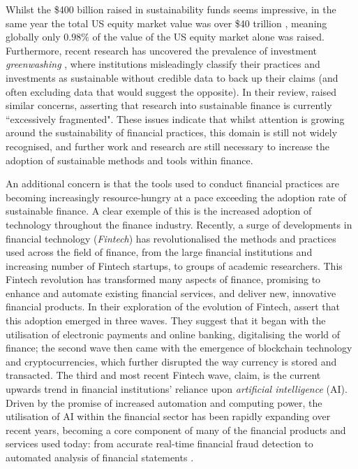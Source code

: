 \documentclass[a4paper, 11pt]{report}
\begin{document}
    Whilst the \$400 billion raised in sustainability funds seems impressive, in the same year the total US equity market value was over \$40 trillion \citep{siblis-2022}, meaning globally only $0.98\%$ of the value of the US equity market alone was raised. Furthermore, recent research has uncovered the prevalence of investment \emph{greenwashing} \citep{popescu-2021}, where institutions misleadingly classify their practices and investments as sustainable without credible data to back up their claims (and often excluding data that would suggest the opposite). In their review, \citet{cunha-2021} raised similar concerns, asserting that research into sustainable finance is currently ``excessively fragmented". These issues indicate that whilst attention is growing around the sustainability of financial practices, this domain is still not widely recognised, and further work and research are still necessary to increase the adoption of sustainable methods and tools within finance. 

    An additional concern is that the tools used to conduct financial practices are becoming increasingly resource-hungry at a pace exceeding the adoption rate of sustainable finance. A clear exemple of this is the increased adoption of technology throughout the finance industry. Recently, a surge of developments in financial technology (\emph{Fintech}) has revolutionalised the methods and practices used across the field of finance, from the large financial institutions and increasing number of Fintech startups, to groups of academic researchers. This Fintech revolution has transformed many aspects of finance, promising to enhance and automate existing financial services, and deliver new, innovative financial products. In their exploration of the evolution of Fintech, \citet{palmie-2020} assert that this adoption emerged in three waves. They suggest that it began with the utilisation of electronic payments and online banking, digitalising the world of finance; the second wave then came with the emergence of blockchain technology and cryptocurrencies, which further disrupted the way currency is stored and transacted. The third and most recent Fintech wave, \citet{palmie-2020} claim, is the current upwards trend in financial institutions' reliance upon \emph{artificial intelligence} (AI). Driven by the promise of increased automation and computing power, the utilisation of AI within the financial sector has been rapidly expanding over recent years, becoming a core component of many of the financial products and services used today: from accurate real-time financial fraud detection \citep{sadgali-2019} to automated analysis of financial statements \citep{amel-2020}.
\end{document}
